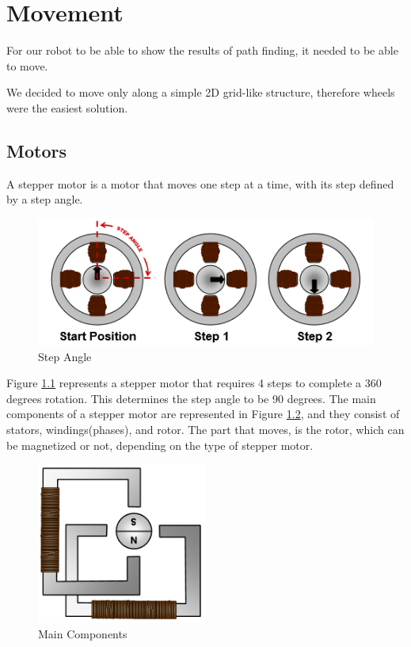 \chapter{Movement}\label{ch:move}
For our robot to be able to show the results of path finding,
it needed to be able to move.

We decided to move only along a simple 2D grid-like structure,
therefore wheels were the easiest solution.

\section{Motors}\label{sec:motors}
A stepper motor is a motor that moves one step at a time, with its step defined by a step angle.

\begin{figure}[ht]
	\centering
	\includegraphics[width=\textwidth]{figures/move/motor1.png}
	\caption{Step Angle}
	\label{fig:angle} 
\end{figure}

Figure \ref{fig:angle} represents a stepper motor that requires 4 steps to complete a 360 degrees rotation. This determines the step angle to be 90 degrees.
The main components of a stepper motor are represented in Figure \ref{fig:main_components}, and they consist of stators, windings(phases), and rotor.
The part that moves, is the rotor, which can be magnetized or not, depending on the type of stepper motor.

\begin{figure}[ht]
	\centering
	\includegraphics[width=0.5\textwidth]{figures/move/motor2.png}
	\caption{Main Components}
	\label{fig:main_components}
\end{figure}

